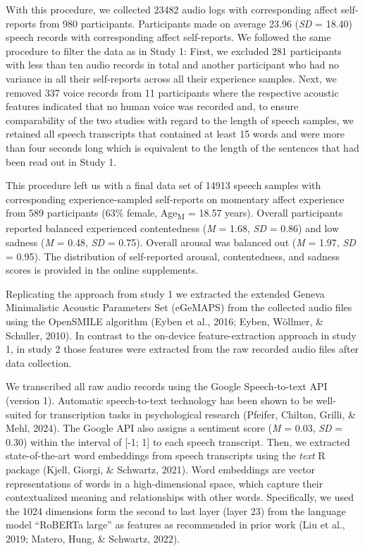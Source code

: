 \documentclass[
  english,
  man,floatsintext]{apa6}
\begin{document}
With this procedure, we collected 23482 audio logs with corresponding affect self-reports from 980 participants. Participants made on average 23.96 (\emph{SD} = 18.40) speech records with corresponding affect self-reports. We followed the same procedure to filter the data as in Study 1: First, we excluded 281 participants with less than ten audio records in total and another participant who had no variance in all their self-reports across all their experience samples. Next, we removed 337 voice records from 11 participants where the respective acoustic features indicated that no human voice was recorded and, to ensure comparability of the two studies with regard to the length of speech samples, we retained all speech transcripts that contained at least 15 words and were more than four seconds long which is equivalent to the length of the sentences that had been read out in Study 1.

This procedure left us with a final data set of 14913 speech samples with corresponding experience-sampled self-reports on momentary affect experience from 589 participants (63\% female, Age\textsubscript{M} = 18.57 years). Overall participants reported balanced experienced contentedness (\emph{M} = 1.68, \emph{SD} = 0.86) and low sadness (\emph{M} = 0.48, \emph{SD} = 0.75). Overall arousal was balanced out (\emph{M} = 1.97, \emph{SD} = 0.95). The distribution of self-reported arousal, contentedness, and sadness scores is provided in the online supplements.

Replicating the approach from study 1 we extracted the extended Geneva Minimalistic Acoustic Parameters Set (eGeMAPS) from the collected audio files using the OpenSMILE algorithm (Eyben et al., 2016; Eyben, Wöllmer, \& Schuller, 2010). In contrast to the on-device feature-extraction approach in study 1, in study 2 those features were extracted from the raw recorded audio files after data collection.

We transcribed all raw audio records using the Google Speech-to-text API (version 1). Automatic speech-to-text technology has been shown to be well-suited for transcription tasks in psychological research (Pfeifer, Chilton, Grilli, \& Mehl, 2024). The Google API also assigns a sentiment score (\emph{M} = 0.03, \emph{SD} = 0.30) within the interval of {[}-1; 1{]} to each speech transcript. Then, we extracted state-of-the-art word embeddings from speech transcripts using the \emph{text} R package (Kjell, Giorgi, \& Schwartz, 2021). Word embeddings are vector representations of words in a high-dimensional space, which capture their contextualized meaning and relationships with other words. Specifically, we used the 1024 dimensions form the second to last layer (layer 23) from the language model ``RoBERTa large'' as features as recommended in prior work (Liu et al., 2019; Matero, Hung, \& Schwartz, 2022).
\end{document}
